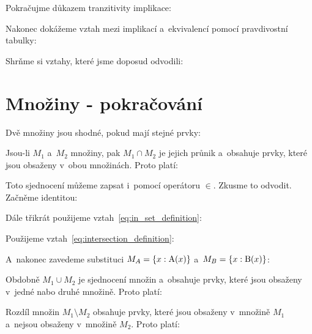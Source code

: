 Pokračujme důkazem tranzitivity implikace:


Nakonec dokážeme vztah mezi implikací a~ekvivalencí pomocí pravdivostní tabulky:



Shrňme si vztahy, které jsme doposud odvodili:

\begin{fact}
\end{fact}

\section{Množiny - pokračování}

Dvě množiny jsou shodné, pokud mají stejné prvky:


Jsou-li \(M_1\) a~\(M_2\) množiny, pak \(M_1 \cap M_2\) je jejich průnik a~obsahuje prvky, které jsou obsaženy v~obou množinách. Proto platí:


Toto sjednocení můžeme zapsat i~pomocí operátoru \(\in\). Zkusme to odvodit. Začněme identitou:

Dále třikrát použijeme vztah~\eqref{eq:in_set_definition}:

Použijeme vztah~\eqref{eq:intersection_definition}:

A~nakonec zavedeme substituci \(M_A = \{x: \mathrm{A}(x)\}\) a~\(M_B = \{x: \mathrm{B}(x)\}\):

Obdobně \(M_1 \cup M_2\) je sjednocení množin a~obsahuje prvky, které jsou obsaženy v~jedné nabo druhé množině. Proto platí:


Rozdíl množin \(M_1 \setminus M_2\) obsahuje prvky, které jsou obsaženy v~množině \(M_1\) a~nejsou obsaženy v~množině \(M_2\). Proto platí:


